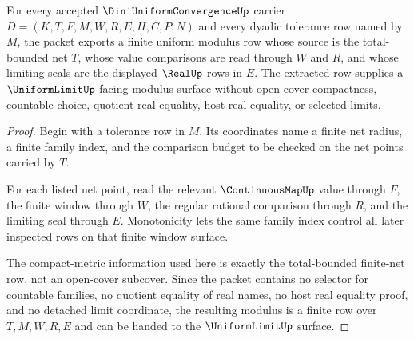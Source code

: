 \begin{theorem}
\label{thm:diniuniformconvergence-uniform-modulus-extraction}
For every accepted $\DiniUniformConvergenceUp$ carrier $D=(K,T,F,M,W,R,E,H,C,P,N)$ and every dyadic tolerance row named by $M$, the packet exports a finite uniform modulus row whose source is the total-bounded net $T$, whose value comparisons are read through $W$ and $R$, and whose limiting seals are the displayed $\RealUp$ rows in $E$. The extracted row supplies a $\UniformLimitUp$-facing modulus surface without open-cover compactness, countable choice, quotient real equality, host real equality, or selected limits.
\end{theorem}
\begin{proof}
Begin with a tolerance row in $M$. Its coordinates name a finite net radius, a finite family index, and the comparison budget to be checked on the net points carried by $T$.

For each listed net point, read the relevant $\ContinuousMapUp$ value through $F$, the finite window through $W$, the regular rational comparison through $R$, and the limiting seal through $E$. Monotonicity lets the same family index control all later inspected rows on that finite window surface.

The compact-metric information used here is exactly the total-bounded finite-net row, not an open-cover subcover. Since the packet contains no selector for countable families, no quotient equality of real names, no host real equality proof, and no detached limit coordinate, the resulting modulus is a finite row over $T,M,W,R,E$ and can be handed to the $\UniformLimitUp$ surface.
\end{proof}

